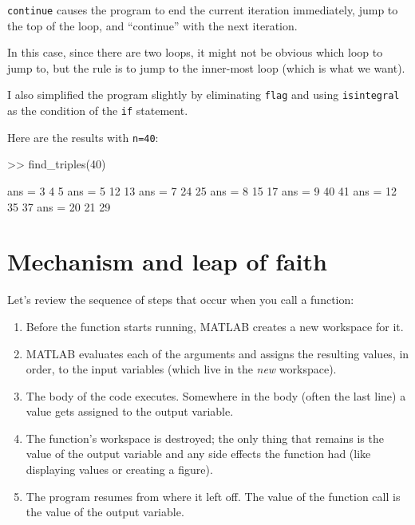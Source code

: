 \documentclass[
]{book}
\numberwithin{Answer}{chapter}
\numberwithin{Exercise}{chapter}
\begin{document}
{\tt continue} causes the program to end the current iteration
immediately, jump to the top of the loop, and ``continue'' with the next iteration.

In this case, since there are two loops, it might not be obvious which loop to jump to, but the rule is to jump to the inner-most loop (which is what we want).


I also simplified the program slightly by eliminating {\tt flag} and using {\tt isintegral} as the condition of the {\tt if} statement.

Here are the results with {\tt n=40}:

\begin{code}
>> find_triples(40)

ans =  3     4     5
ans =  5    12    13
ans =  7    24    25
ans =  8    15    17
ans =  9    40    41
ans = 12    35    37
ans = 20    21    29
\end{code}


\section{Mechanism and leap of faith}


Let's review the sequence of steps that occur when you call a function:

\begin{enumerate}

\item Before the function starts running, MATLAB creates a new
workspace for it.

\item MATLAB evaluates each of the arguments and assigns
the resulting values, in order, to the input variables (which
live in the {\em new} workspace).

\item The body of the code executes.  Somewhere in the body
(often the last line) a value gets assigned to the output variable.

\item The function's workspace is destroyed; the only thing
that remains is the value of the output variable and any side
effects the function had (like displaying values or creating
a figure).

\item The program resumes from where it left off.  The value
of the function call is the value of the output variable.

\end{enumerate}
\end{document}
